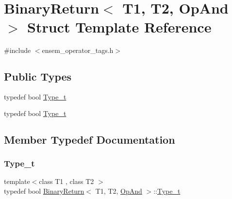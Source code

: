 \hypertarget{structBinaryReturn_3_01T1_00_01T2_00_01OpAnd_01_4}{}\section{Binary\+Return$<$ T1, T2, Op\+And $>$ Struct Template Reference}
\label{structBinaryReturn_3_01T1_00_01T2_00_01OpAnd_01_4}


{\ttfamily \#include $<$ensem\+\_\+operator\+\_\+tags.\+h$>$}

\subsection*{Public Types}
\begin{DoxyCompactItemize}
\item 
typedef bool \mbox{\hyperlink{structBinaryReturn_3_01T1_00_01T2_00_01OpAnd_01_4_a8eacc4b4e150e0f58ff37e1e48ff0649}{Type\+\_\+t}}
\item 
typedef bool \mbox{\hyperlink{structBinaryReturn_3_01T1_00_01T2_00_01OpAnd_01_4_a8eacc4b4e150e0f58ff37e1e48ff0649}{Type\+\_\+t}}
\end{DoxyCompactItemize}


\subsection{Member Typedef Documentation}
\mbox{\label{structBinaryReturn_3_01T1_00_01T2_00_01OpAnd_01_4_a8eacc4b4e150e0f58ff37e1e48ff0649}} 
\subsubsection{\texorpdfstring{Type\_t}{Type\_t}\hspace{0.1cm}{\footnotesize\ttfamily [1/2]}}
{\footnotesize\ttfamily template$<$class T1 , class T2 $>$ \\
typedef bool \mbox{\hyperlink{structBinaryReturn}{Binary\+Return}}$<$ T1, T2, \mbox{\hyperlink{structOpAnd}{Op\+And}} $>$\+::\mbox{\hyperlink{structBinaryReturn_3_01T1_00_01T2_00_01OpAnd_01_4_a8eacc4b4e150e0f58ff37e1e48ff0649}{Type\+\_\+t}}}

\mbox{\label{structBinaryReturn_3_01T1_00_01T2_00_01OpAnd_01_4_a8eacc4b4e150e0f58ff37e1e48ff0649}} 
